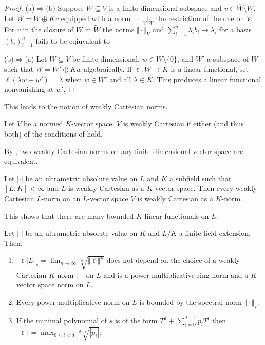 \begin{proof}
   (a)$\Rightarrow$(b) Suppose $W\subseteq V$ is a finite dimensional subspace and $v\in\overline{W}\setminus W$. Let $\widetilde{W}=W\oplus Kv$ equipped with a norm $\Vert \cdot\Vert_{V}|_{\widetilde{W}}$ the restriction of the one on $V$. For $v$ in the closure of $W$ in $\widetilde{W}$ the norms $\Vert\cdot\Vert_{V}$ and $\sum_{i=1}^{n}\lambda_{i}b_{i}\mapsto \lambda_{i}$ for a basis $(b_{i})_{i=1}^{n}$ fails to be eqiuvalent to 

   (b)$\Rightarrow$(a) Let $W\subseteq V$ be finite dimensional, $w\in W\setminus\{0\}$, and $W'$ a subspace of $W$ such that $W=W'\oplus K w$ algebraically. If $\ell:W\to K$ is a linear functional, set $\ell(\lambda w-w')=\lambda$ when $w\in W'$ and all $\lambda\in K$. This produces a linear functional nonvanishing at $w'$. 
\end{proof}
This leads to the notion of weakly Cartesian norms. 
\begin{definition}\label{def: weakly Cartesian norm}
    Let $V$ be a normed $K$-vector space. $V$ is weakly Cartesian if either (and thus both) of the conditions of  hold. 
\end{definition}
\begin{remark}
    By , two weakly Cartesian norms on any finite-dimensional vector space are equivalent. 
\end{remark}
\begin{lemma}\label{lem: weakly cartesian as K-norm}
    Let $|\cdot|$ be an ultrametric absolute value on $L$ and $K$ a subfield such that $[L:K]<\infty$ and $L$ is weakly Cartesian as a $K$-vector space. Then every weakly Cartesian $L$-norm on an $L$-vector space $V$ is weakly Cartesian as a $K$-norm. 
\end{lemma}
This shows that there are many bounded $K$-linear functionals on $L$. 
\begin{proposition}\label{prop: spectral norm}
    Let $|\cdot|$ be an ultrametric absolute value on $K$ and $L/K$ a finite field extension. Then: 
    \begin{enumerate}[label=(\roman*)]
        \item $\Vert\ell|L\Vert_{s}=\lim_{n\to\infty}\sqrt[n]{\Vert\ell\Vert^{n}}$ does not depend on the choice of a weakly Cartesian $K$-norm $\Vert\cdot\Vert$ on $L$ and is a power multiplicative ring norm and a $K$-vector space norm on $L$. 
        \item Every power multiplicative norm on $L$ is bounded by the spectral norm $\Vert\cdot\Vert_{s}$. 
        \item If the minimal polynomial of $s$ is of the form $T^{d}+\sum_{i=0}^{d-1}p_{i}T^{i}$ then $\Vert\ell\Vert=\max_{0\leq i<d}\sqrt[d-i]{|p_{i}|}$. 
    \end{enumerate}
\end{proposition}
